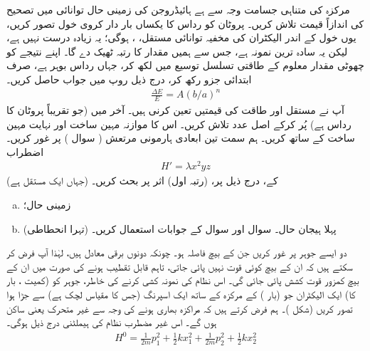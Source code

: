 مرکزہ کی متناہی جسامت وجہ سے ہے ہائیڈروجن کی زمینی حال توانائی میں تصحیح کی اندازاً قیمت تلاش کریں۔ پروٹان کو رداس  کا یکساں بار دار کروی خول تصور کریں، یوں خول کے اندر الیکٹران ‏کی مخفیہ توانائی مستقل، ، ہوگی؛ یہ زیادہ درست نہیں ہے، لیکن یہ سادہ ترین نمونہ ہے، جس سے ہمیں مقدار کا رتبہ ٹھیک دے گا۔ اپنے نتیجے کو چھوٹی مقدار معلوم  کے طاقتی تسلسل توسیع میں لکھ کر، جہاں  رداس بوہر ہے، صرف ابتدائی جزو رکھ کر، درج ذیل روپ میں جواب حاصل کریں۔ 
\begin{align*}
\frac{\Delta E}{E} = A (b/a)^n
\end{align*}
آپ نے مستقل  اور طاقت  کی قیمتیں تعین کرنی ہیں۔ آخر میں  (جو تقریباً پروٹان کا رداس ہے) پُر کرکے اصل عدد تلاش کریں۔ اس کا موازنہ مہین ساخت اور نہایت مہین ساخت کے ساتھ کریں۔ 
ہم سمت تین ابعادی ہارمونی مرتعش ( سوال ) پر غور کریں۔ اضطراب
\begin{align*} 
H' = \lambda x^2 y z
\end{align*}
(جہاں  ایک مستقل ہے) کے، درج ذیل پر، (رتبہ اول) اثر پر بحث کریں۔ 
\begin{enumerate}[a.]
\item
زمینی حال؛
\item
(تہرا انحطاطی) پہلا ہیجان حال۔  سوال  اور سوال  کے جوابات استعمال کریں۔ 
\end{enumerate}
 دو ایسے جوہر پر غور کریں جن کے بیچ فاصلہ  ہو۔ چونکہ دونوں برقی معادل ہیں، لہٰذا آپ فرض کر سکتے ہیں کہ ان کے بیچ کوئی قوت نہیں پائی جاتی، تاہم قابل تقطیب ہونے کی صورت میں ان کے بیچ کمزور قوت کشش پائی جائی گی۔ اس نظام کی نمونہ کشی کرنے کی خاطر، جوہر کو (کمیت ، بار  کا) ایک الیکٹران جو (بار ) کے مرکزہ کے ساتھ ایک اسپرنگ (جس کا مقیاس لچک  ہے) سے جڑا ہوا تصور کریں (شکل )۔ ہم فرض کرتے ہیں کہ مراکزہ بھاری ہونے کی وجہ سے  غیر متحرک یعنی ساکن ہوں گے۔ اس غیر مضطرب نظام کی ہیملٹنی درج ذیل ہوگی۔
\begin{align}\label{مساوات_غیر_مضطرب_جوہر_کل_ہیملٹنی}
H^0 = \frac{1}{2m} p_1^2 + \frac{1}{2} k x_1^2 + \frac{1}{2m} p_2^2 + \frac{1}{2} k x_2^2
\end{align}
